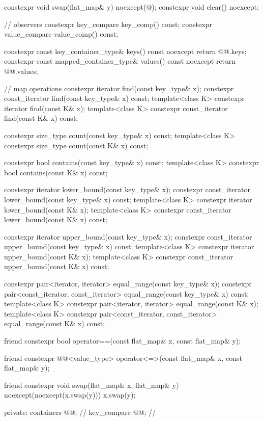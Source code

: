 \begin{codeblock}
{{    constexpr void swap(flat_map& y) noexcept(@\seebelow@);
    constexpr void clear() noexcept;

    // observers
    constexpr key_compare key_comp() const;
    constexpr value_compare value_comp() const;

    constexpr const key_container_type& keys() const noexcept      { return @@.keys; }
    constexpr const mapped_container_type& values() const noexcept { return @@.values; }

    // map operations
    constexpr iterator find(const key_type& x);
    constexpr const_iterator find(const key_type& x) const;
    template<class K> constexpr iterator find(const K& x);
    template<class K> constexpr const_iterator find(const K& x) const;

    constexpr size_type count(const key_type& x) const;
    template<class K> constexpr size_type count(const K& x) const;

    constexpr bool contains(const key_type& x) const;
    template<class K> constexpr bool contains(const K& x) const;

    constexpr iterator lower_bound(const key_type& x);
    constexpr const_iterator lower_bound(const key_type& x) const;
    template<class K> constexpr iterator lower_bound(const K& x);
    template<class K> constexpr const_iterator lower_bound(const K& x) const;

    constexpr iterator upper_bound(const key_type& x);
    constexpr const_iterator upper_bound(const key_type& x) const;
    template<class K> constexpr iterator upper_bound(const K& x);
    template<class K> constexpr const_iterator upper_bound(const K& x) const;

    constexpr pair<iterator, iterator> equal_range(const key_type& x);
    constexpr pair<const_iterator, const_iterator> equal_range(const key_type& x) const;
    template<class K> constexpr pair<iterator, iterator> equal_range(const K& x);
    template<class K>
      constexpr pair<const_iterator, const_iterator> equal_range(const K& x) const;

    friend constexpr bool operator==(const flat_map& x, const flat_map& y);

    friend constexpr @@<value_type>
      operator<=>(const flat_map& x, const flat_map& y);

    friend constexpr void swap(flat_map& x, flat_map& y) noexcept(noexcept(x.swap(y)))
      { x.swap(y); }

  private:
    containers @@;               // \expos
    key_compare @@;        // \expos

}}
\end{codeblock}
